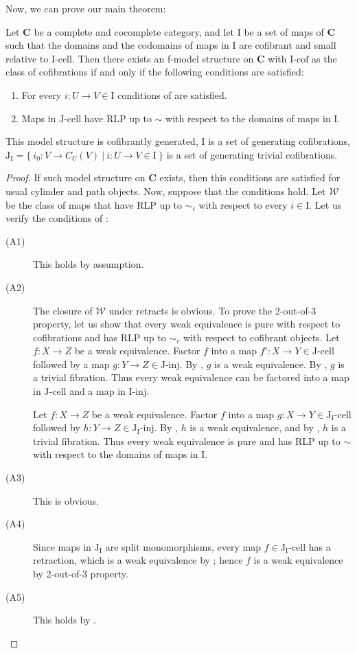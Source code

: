 \documentclass{amsart}
\theoremstyle{definition}
\newcommand{\we}{\mathcal{W}}
\newcommand{\cat}[1]{\mathbf{#1}}
\newcommand{\C}{\cat{C}}
\newcommand{\I}{\mathrm{I}}
\newcommand{\J}{\mathrm{J}}
\newcommand{\class}[2]{#1\text{-}\mathrm{#2}}
\newcommand{\Iinj}[1][\I]{\class{#1}{inj}}
\newcommand{\Icell}[1][\I]{\class{#1}{cell}}
\newcommand{\Icof}[1][\I]{\class{#1}{cof}}
\newcommand{\Jinj}[1][]{\Iinj[\J#1]}
\newcommand{\Jcell}[1][]{\Icell[\J#1]}
\newcommand{\cyli}{i}
\begin{document}
Now, we can prove our main theorem:

\begin{thm}[main]
Let $\C$ be a complete and cocomplete category, and let $\I$ be a set of maps of $\C$
such that the domains and the codomains of maps in $\I$ are cofibrant and small relative to $\Icell$.
Then there exists an f-model structure on $\C$ with $\Icof$ as the class of cofibrations if and only if the following conditions are satisfied:
\begin{enumerate}
\item For every $i : U \to V \in \I$ conditions of  are satisfied.
\item Maps in $\Jcell$ have RLP up to $\sim$ with respect to the domains of maps in $\I$.
\end{enumerate}
This model structure is cofibrantly generated, $\I$ is a set of generating cofibrations,
$\J_\I = \{\ \cyli_0 : V \to C_U(V)\ |\ i : U \to V \in \I \ \}$ is a set of generating trivial cofibrations.
\end{thm}
\begin{proof}
If such model structure on $\C$ exists, then this conditions are satisfied for usual cylinder and path objects.
Now, suppose that the conditions hold.
Let $\we$ be the class of maps that have RLP up to $\sim_i$ with respect to every $i \in \I$.
Let us verify the conditions of :
\begin{description}
\item[(A1)] This holds by assumption.
\item[(A2)] The closure of $\we$ under retracts is obvious.
To prove the 2-out-of-3 property, let us show that every weak equivalence is pure with respect to cofibrations and has RLP up to $\sim_r$ with respect to cofibrant objects.
Let $f : X \to Z$ be a weak equivalence.
Factor $f$ into a map $f' : X \to Y \in \Jcell$ followed by a map $g : Y \to Z \in \Jinj$.
By , $g$ is a weak equivalence.
By , $g$ is a trivial fibration.
Thus every weak equivalence can be factored into a map in $\Jcell$ and a map in $\Iinj$.

Let $f : X \to Z$ be a weak equivalence.
Factor $f$ into a map $g : X \to Y \in \Jcell[_\I]$ followed by $h : Y \to Z \in \Jinj[_\I]$.
By , $h$ is a weak equivalence, and by , $h$ is a trivial fibration.
Thus every weak equivalence is pure and has RLP up to $\sim$ with respect to the domains of maps in $\I$.
\item[(A3)] This is obvious.
\item[(A4)] Since maps in $\J_\I$ are split monomorphisms, every map
$f \in \Jcell[_\I]$ has a retraction, which is a weak equivalence by
; hence $f$ is a weak equivalence by 2-out-of-3 property.
\item[(A5)] This holds by .
\end{description}
\end{proof}
\end{document}
